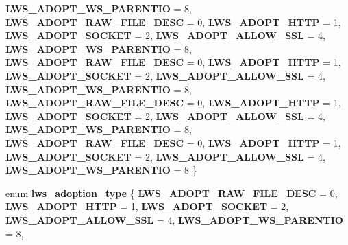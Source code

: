 \begin{DoxyCompactItemize}
{\bfseries L\+W\+S\+\_\+\+A\+D\+O\+P\+T\+\_\+\+W\+S\+\_\+\+P\+A\+R\+E\+N\+T\+IO} = 8, 
{\bfseries L\+W\+S\+\_\+\+A\+D\+O\+P\+T\+\_\+\+R\+A\+W\+\_\+\+F\+I\+L\+E\+\_\+\+D\+E\+SC} = 0, 
{\bfseries L\+W\+S\+\_\+\+A\+D\+O\+P\+T\+\_\+\+H\+T\+TP} = 1, 
\newline
{\bfseries L\+W\+S\+\_\+\+A\+D\+O\+P\+T\+\_\+\+S\+O\+C\+K\+ET} = 2, 
{\bfseries L\+W\+S\+\_\+\+A\+D\+O\+P\+T\+\_\+\+A\+L\+L\+O\+W\+\_\+\+S\+SL} = 4, 
{\bfseries L\+W\+S\+\_\+\+A\+D\+O\+P\+T\+\_\+\+W\+S\+\_\+\+P\+A\+R\+E\+N\+T\+IO} = 8, 
{\bfseries L\+W\+S\+\_\+\+A\+D\+O\+P\+T\+\_\+\+R\+A\+W\+\_\+\+F\+I\+L\+E\+\_\+\+D\+E\+SC} = 0, 
\newline
{\bfseries L\+W\+S\+\_\+\+A\+D\+O\+P\+T\+\_\+\+H\+T\+TP} = 1, 
{\bfseries L\+W\+S\+\_\+\+A\+D\+O\+P\+T\+\_\+\+S\+O\+C\+K\+ET} = 2, 
{\bfseries L\+W\+S\+\_\+\+A\+D\+O\+P\+T\+\_\+\+A\+L\+L\+O\+W\+\_\+\+S\+SL} = 4, 
{\bfseries L\+W\+S\+\_\+\+A\+D\+O\+P\+T\+\_\+\+W\+S\+\_\+\+P\+A\+R\+E\+N\+T\+IO} = 8, 
\newline
{\bfseries L\+W\+S\+\_\+\+A\+D\+O\+P\+T\+\_\+\+R\+A\+W\+\_\+\+F\+I\+L\+E\+\_\+\+D\+E\+SC} = 0, 
{\bfseries L\+W\+S\+\_\+\+A\+D\+O\+P\+T\+\_\+\+H\+T\+TP} = 1, 
{\bfseries L\+W\+S\+\_\+\+A\+D\+O\+P\+T\+\_\+\+S\+O\+C\+K\+ET} = 2, 
{\bfseries L\+W\+S\+\_\+\+A\+D\+O\+P\+T\+\_\+\+A\+L\+L\+O\+W\+\_\+\+S\+SL} = 4, 
\newline
{\bfseries L\+W\+S\+\_\+\+A\+D\+O\+P\+T\+\_\+\+W\+S\+\_\+\+P\+A\+R\+E\+N\+T\+IO} = 8, 
{\bfseries L\+W\+S\+\_\+\+A\+D\+O\+P\+T\+\_\+\+R\+A\+W\+\_\+\+F\+I\+L\+E\+\_\+\+D\+E\+SC} = 0, 
{\bfseries L\+W\+S\+\_\+\+A\+D\+O\+P\+T\+\_\+\+H\+T\+TP} = 1, 
{\bfseries L\+W\+S\+\_\+\+A\+D\+O\+P\+T\+\_\+\+S\+O\+C\+K\+ET} = 2, 
\newline
{\bfseries L\+W\+S\+\_\+\+A\+D\+O\+P\+T\+\_\+\+A\+L\+L\+O\+W\+\_\+\+S\+SL} = 4, 
{\bfseries L\+W\+S\+\_\+\+A\+D\+O\+P\+T\+\_\+\+W\+S\+\_\+\+P\+A\+R\+E\+N\+T\+IO} = 8
 \}
\item 
\mbox{\label{group__sock-adopt_ga7e944a23efbb50187d34c62fb841d071}} 
enum {\bfseries lws\+\_\+adoption\+\_\+type} \{ \newline
{\bfseries L\+W\+S\+\_\+\+A\+D\+O\+P\+T\+\_\+\+R\+A\+W\+\_\+\+F\+I\+L\+E\+\_\+\+D\+E\+SC} = 0, 
{\bfseries L\+W\+S\+\_\+\+A\+D\+O\+P\+T\+\_\+\+H\+T\+TP} = 1, 
{\bfseries L\+W\+S\+\_\+\+A\+D\+O\+P\+T\+\_\+\+S\+O\+C\+K\+ET} = 2, 
{\bfseries L\+W\+S\+\_\+\+A\+D\+O\+P\+T\+\_\+\+A\+L\+L\+O\+W\+\_\+\+S\+SL} = 4, 
\newline
{\bfseries L\+W\+S\+\_\+\+A\+D\+O\+P\+T\+\_\+\+W\+S\+\_\+\+P\+A\+R\+E\+N\+T\+IO} = 8, 

\end{DoxyCompactItemize}

